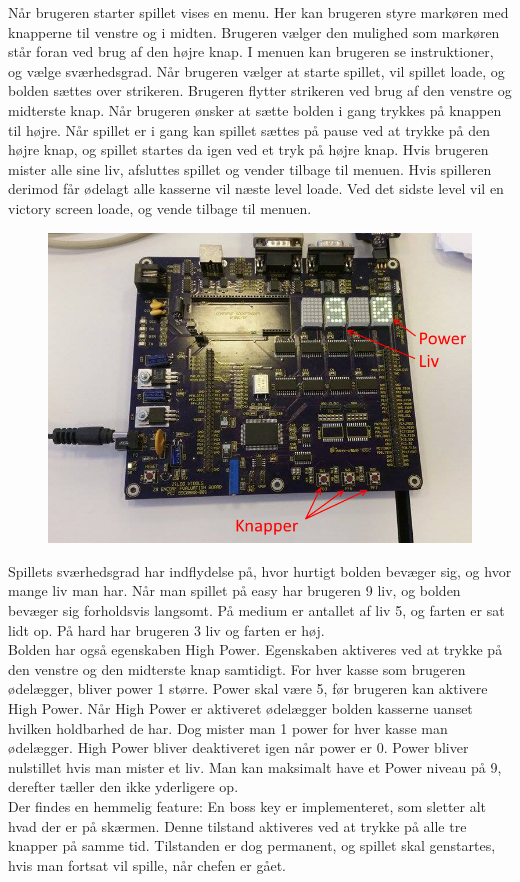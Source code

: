 Når brugeren starter spillet vises en menu. Her kan brugeren styre markøren med knapperne til venstre og i midten. Brugeren vælger den mulighed som markøren står foran ved brug af den højre knap. I menuen kan brugeren se instruktioner, og vælge sværhedsgrad. Når brugeren vælger at starte spillet, vil spillet loade, og bolden sættes over strikeren. Brugeren flytter strikeren ved brug af den venstre og midterste knap. Når brugeren ønsker at sætte bolden i gang trykkes på knappen til højre. Når spillet er i gang kan spillet sættes på pause ved at trykke på den højre knap, og spillet startes da igen ved et tryk på højre knap. Hvis brugeren mister alle sine liv, afsluttes spillet og vender tilbage til menuen. Hvis spilleren derimod får ødelagt alle kasserne vil næste level loade. Ved det sidste level vil en victory screen loade, og vende tilbage til menuen. \\
\begin{figure}[h]
\begin{center}
\includegraphics[scale=0.6]{img/Board.png}
\end{center}
\end{figure}
Spillets sværhedsgrad har indflydelse på, hvor hurtigt bolden bevæger sig, og hvor mange liv man har. Når man spillet på easy har brugeren 9 liv, og bolden bevæger sig forholdsvis langsomt. På medium er antallet af liv 5, og farten er sat lidt op. På hard har brugeren 3 liv og farten er høj.
\\
Bolden har også egenskaben High Power. Egenskaben aktiveres ved at trykke på den venstre og den midterste knap samtidigt.  For hver kasse som brugeren ødelægger, bliver power 1 større. Power skal være 5, før brugeren kan aktivere High Power. Når High Power er aktiveret ødelægger bolden kasserne uanset hvilken holdbarhed de har. Dog mister man 1 power for hver kasse man ødelægger. High Power bliver deaktiveret igen når power er 0. Power  bliver nulstillet hvis man mister et liv. Man kan maksimalt have et Power niveau på 9, derefter tæller den ikke yderligere op. \\

Der findes en hemmelig feature: En boss key er implementeret, som sletter alt hvad der er på skærmen. Denne tilstand aktiveres ved at trykke på alle tre knapper på samme tid. Tilstanden er dog permanent, og spillet skal genstartes, hvis man fortsat vil spille, når chefen er gået. 

